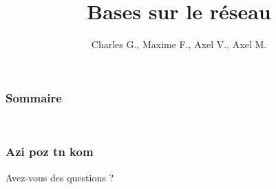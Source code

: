 \documentclass{beamer}
\title{Bases sur le réseau}
\author{Charles G., Maxime F., Axel V., Axel M.}
\begin{document}
\begin{frame}\frametitle{}
   \maketitle
\end{frame}


\begin{frame}\frametitle{Sommaire}
    \begin{columns}[t]
        \begin{column}{5cm}
            \tableofcontents[sections={1-2}]
        \end{column}
        \begin{column}{5cm}
            \tableofcontents[sections={3}]
        \end{column}
    \end{columns}
\end{frame}











\section*{}
\begin{frame}\frametitle{Azi poz tn kom}
    {\Huge Avez-vous des questions ?}
\end{frame}
\end{document}

